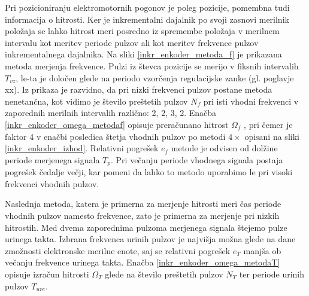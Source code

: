 \documentclass[a4paper,twoside,openright,12pt]{book}
\begin{document}
Pri pozicioniranju elektromotornih pogonov je poleg pozicije, pomembna tudi informacija o hitrosti.  
Ker je inkrementalni dajalnik po svoji zasnovi merilnik položaja se lahko hitrost meri posredno iz spremembe položaja v merilnem intervalu kot meritev periode pulzov ali kot meritev frekvence pulzov inkrementalnega dajalnika. 
Na sliki \ref{inkr_enkoder_metoda_f} je prikazana metoda merjenja frekvence. Pulzi iz števca pozicije se merijo v fiksnih intervalih $T_{vz}$, le-ta je določen glede na periodo vzorčenja regulacijske zanke (gl. poglavje xx). Iz prikaza je razvidno, da pri nizki frekvenci pulzov postane metoda nenetančna, kot vidimo je število preštetih pulzov $N_f$ pri isti vhodni frekvenci v zaporednih merilnih intervalih različno: 2, 2, 3, 2. Enačba \ref{inkr_enkoder_omega_metodaf} opisuje preračunano hitrost $\Omega_f$ \cite{vcurkovivcmeritev}, pri čemer je faktor 4 v enačbi posledica štetja vhodnih pulzov po metodi  $4\times$ opisani na sliki \ref{inkr_enkoder_izhod}. Relativni pogrešek $e_f$ \cite{bergelj1993osnove} metode je odvisen od dolžine periode merjenega signala $T_p$. Pri večanju periode vhodnega signala postaja pogrešek čedalje večji, kar pomeni da lahko to metodo uporabimo le pri visoki frekvenci vhodnih pulzov.

Naslednja metoda, katera je primerna za merjenje hitrosti meri čas periode vhodnih pulzov namesto frekvence, zato je primerna za merjenje pri nizkih hitrostih. Med dvema zaporednima pulzoma merjenega signala štejemo pulze urinega takta. Izbrana frekvenca urinih pulzov je najvišja možna glede na dane zmožnosti elektronske merilne enote, saj se relativni pogrešek  $e_T$ manjša ob večanju frekvence urinega takta. Enačba \ref{inkr_enkoder_omega_metodaT} opisuje izračun hitrosti $\Omega_T$ glede na število preštetih pulzov $N_T$ ter periode urinih pulzov $T_{ure}$.
\end{document}
